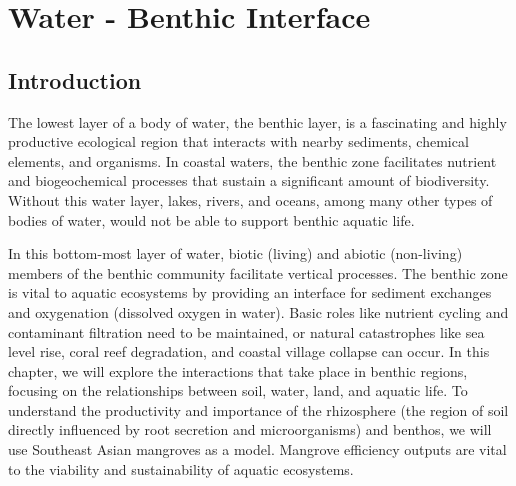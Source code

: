 
\chapter{Water - Benthic Interface}

\section{Introduction}  

The lowest layer of a body of water, the benthic layer, is a fascinating and highly productive ecological region that interacts with nearby sediments, chemical elements, and organisms. In coastal waters, the benthic zone facilitates nutrient and biogeochemical processes that sustain a significant amount of biodiversity. Without this water layer, lakes, rivers, and oceans, among many other types of bodies of water, would not be able to support benthic aquatic life.

In this bottom-most layer of water, biotic (living) and abiotic (non-living) members of the benthic community facilitate vertical processes. The benthic zone is vital to aquatic ecosystems by providing an interface for sediment exchanges and oxygenation (dissolved oxygen in water). Basic roles like nutrient cycling and contaminant filtration need to be maintained, or natural catastrophes like sea level rise, coral reef degradation, and coastal village collapse can occur. In this chapter, we will explore the interactions that take place in benthic regions, focusing on the relationships between soil, water, land, and aquatic life. To understand the productivity and importance of the rhizosphere (the region of soil directly influenced by root secretion and microorganisms) and benthos, we will use Southeast Asian mangroves as a model. Mangrove efficiency outputs are vital to the viability and sustainability of aquatic ecosystems. 


